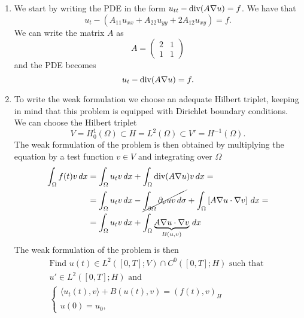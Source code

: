 \begin{enumerate}
    \item We start by writing the PDE in the form \(u_{tt} - \text{div}(A \nabla u) = f\). We
          have that
          \[
              u_{t} - \left(A_{11} u_{xx} + A_{22} u_{yy} + 2A_{12} u_{xy}\right) = f.
          \]
          We can write the matrix \(A\) as
          \[
              A = \begin{pmatrix}
                  2 & 1 \\
                  1 & 1
              \end{pmatrix}
          \]
          and the PDE becomes
          \[
              u_{t} - \text{div} (A \nabla u) = f.
          \]
    \item To write the weak formulation we choose an adequate Hilbert triplet, keeping in
          mind that this problem is equipped with Dirichlet boundary conditions. We can
          choose the Hilbert triplet
          \[
              V = H^1_0(\Omega) \subset H = L^2(\Omega) \subset V' = H^{-1}(\Omega).
          \]
          The weak formulation of the problem is then obtained by multiplying the
          equation by a test function \(v \in V\) and integrating over \(\Omega\)
          \begin{align*}
              \int_\Omega f(t) v \, dx & = \int_\Omega u_{t} v \, dx + \int_\Omega \text{div}(A \nabla u)v \, dx =                                                                                  \\
                                       & = \int_\Omega u_{t} v \, dx - \cancel{\int_{\partial\Omega} \partial_\nu u v \, d\sigma} + \int_\Omega \left[A \nabla u \cdot \nabla v\right] \, dx = \\
                                       & = \int_\Omega u_{t} v \, dx + \int_\Omega \underbrace{A \nabla u \cdot \nabla v}_{B(u, v)} \, dx
          \end{align*}
          The weak formulation of the problem is then
          \[
              \begin{split}
                  \text{Find } u(t) \in L^2([0, T]; V)\cap C^0([0, T]; H)\text{ such that } \\
                  u' \in L^2([0, T];H)\text{ and }                                          \\
                  \begin{cases}
                      \langle u_{t}(t), v \rangle + B(u(t), v) = (f(t), v)_H \\
                      u(0) = u_0,

\end{cases}
\end{split}\]
\end{enumerate}
